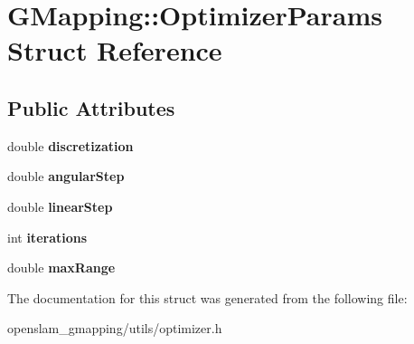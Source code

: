 \hypertarget{structGMapping_1_1OptimizerParams}{}\section{G\+Mapping\+:\+:Optimizer\+Params Struct Reference}
\label{structGMapping_1_1OptimizerParams}
\subsection*{Public Attributes}
\begin{DoxyCompactItemize}
\item 
\mbox{\label{structGMapping_1_1OptimizerParams_a1781eb401e8135dea9dc68cb7941012b}} 
double {\bfseries discretization}
\item 
\mbox{\label{structGMapping_1_1OptimizerParams_a52ea9cd122e73af465e8a2acb14693d2}} 
double {\bfseries angular\+Step}
\item 
\mbox{\label{structGMapping_1_1OptimizerParams_a0e413b12fe56d946d07c38683b861b6f}} 
double {\bfseries linear\+Step}
\item 
\mbox{\label{structGMapping_1_1OptimizerParams_a3c10d4d24836c9cce2b7bb6f8cd7bcff}} 
int {\bfseries iterations}
\item 
\mbox{\label{structGMapping_1_1OptimizerParams_a1d0ae07a6c85a217b684ea597d4bf444}} 
double {\bfseries max\+Range}
\end{DoxyCompactItemize}


The documentation for this struct was generated from the following file\+:\begin{DoxyCompactItemize}
\item 
openslam\+\_\+gmapping/utils/optimizer.\+h\end{DoxyCompactItemize}
